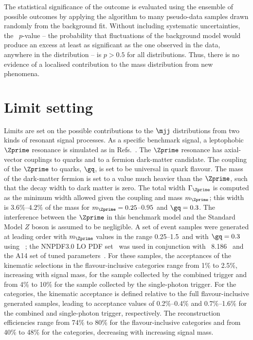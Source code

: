 The statistical significance of the outcome is evaluated using the ensemble of possible outcomes by applying the algorithm to many pseudo-data samples drawn randomly from the background fit.
Without including systematic uncertainties, the \BumpHunter\ $p$-value -- the probability that fluctuations of the background model would produce an excess at least as significant as the one observed in the data, anywhere in the distribution -- is $p > 0.5$ for all distributions.
Thus, there is no evidence of a localised contribution to the mass distribution from new phenomena.

\section{Limit setting}
\label{sec:limits}

Limits are set on the possible contributions to the $\mjj$ distributions from two kinds of resonant signal processes.
As a specific benchmark signal, a leptophobic $\Zprime$ resonance is simulated as in Refs.~\cite{LHCDMF:2015,EXOT-2015-02}.
The $\Zprime$ resonance has axial-vector couplings to quarks and to a fermion dark-matter candidate.
The coupling of the $\Zprime$ to quarks, $\gq$, is set to be universal in quark flavour.
The mass of the dark-matter fermion is set to a value much heavier than the $\Zprime$, such that the decay width to dark matter is zero.
The total width $\Gamma_{\Zprime}$ is computed as the minimum width allowed given the coupling and mass $m_{\Zprime}$; this width is $3.6\%$--$4.2\%$ of the mass for $m_{\Zprime}=0.25$--$0.95$~\TeV and $\gq=0.3$. 
The interference between the $\Zprime$ in this benchmark model and the Standard Model $Z$ boson is assumed to be negligible.
A set of event samples were generated at leading order with $m_{\Zprime}$ values in the range 0.25--1.5~\TeV and with $\gq=0.3$ using ~\cite{Alwall:2014hca}; the \textsc{NNPDF3.0 LO} PDF set~\cite{Ball:2012cx} was used in conjunction with \PYTHIA~8.186~\cite{Sjostrand:2007gs} and the \textsc{A14} set of tuned parameters~\cite{ATL-PHYS-PUB-2014-021}.
For these samples, the acceptances of the kinematic selections in the flavour-inclusive categories range from 1\% to 2.5\%, increasing with signal mass, for the sample collected by the combined trigger and from 4\% to 10\% for the sample collected by the single-photon trigger. 
For the \btagged categories, the kinematic acceptance is defined relative to the full flavour-inclusive generated samples, leading to acceptance values of 0.2\%--0.4\% and 0.7\%--1.6\% for the combined and single-photon trigger, respectively. 
The reconstruction efficiencies range from 74\% to 80\% for the flavour-inclusive categories and from 40\% to 48\% for the \btagged categories, decreasing with increasing signal mass.

